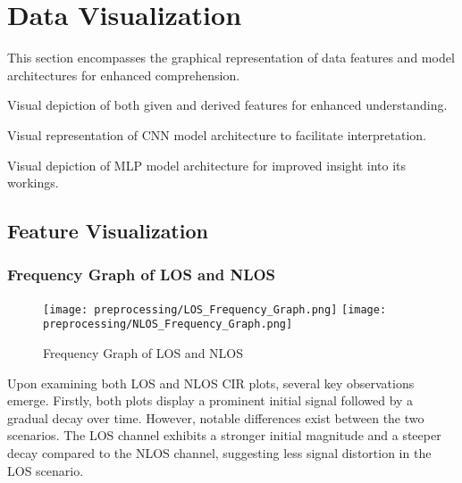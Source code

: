 \section{Data Visualization}\label{data_visualisation}

This section encompasses the graphical representation of data features and model architectures for enhanced comprehension.

\begin{description}[style=nextline]
    \item[Feature Visualization:] Visual depiction of both given and derived features for enhanced understanding.
    \item[Convolution Neural Network:] Visual representation of CNN model architecture to facilitate interpretation.
    \item[Multilayer Perceptron:] Visual depiction of MLP model architecture for improved insight into its workings.
\end{description}



\subsection{Feature Visualization}\label{feature_visualization}

\subsubsection{Frequency Graph of LOS and NLOS}\label{frequency_graph}

\begin{figure}[H] 
	\centering
	\texttt{[image: preprocessing/LOS\_Frequency\_Graph.png]}
	\texttt{[image: preprocessing/NLOS\_Frequency\_Graph.png]}
	\caption{Frequency Graph of LOS and NLOS}\label{fig:frequency_graph}
\end{figure}


Upon examining both LOS and NLOS CIR plots, several key observations emerge. Firstly, both plots display a prominent initial signal followed by a gradual decay over time. However, notable differences exist between the two scenarios. The LOS channel exhibits a stronger initial magnitude and a steeper decay compared to the NLOS channel, suggesting less signal distortion in the LOS scenario.

